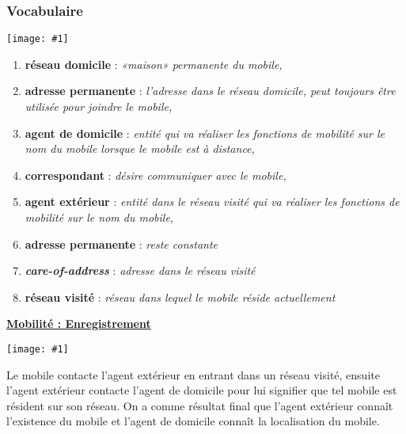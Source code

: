 \documentclass{article}
\newcommand{\imgR}[2]{\begin{center}\texttt{[image: \#1]}\end{center}}
\newcommand{\bfp}[2]{\item \textbf{#1} : \textit{#2}}
\newcommand{\stitre}[1]{\noindent\textbf{\underline{#1}} \\}
\begin{document}
\subsubsection{Vocabulaire}

\imgR{CN_163.png}{300} 

\begin{enumerate}
\bfp{réseau domicile}{«maison» permanente du mobile,}
\bfp{adresse permanente}{l'adresse dans le réseau domicile, peut toujours être utilisée pour joindre le mobile,}
\bfp{agent de domicile}{entité qui va réaliser les fonctions de mobilité sur le nom du mobile lorsque le 
mobile est 
à distance,}
\bfp{correspondant}{désire communiquer avec le mobile,}
\bfp{agent extérieur}{entité dans le réseau visité qui va réaliser les fonctions de mobilité sur le nom du 
mobile,}
\bfp{adresse permanente}{reste constante}
\bfp{\textit{care-of-address}}{adresse dans le réseau visité}
\bfp{réseau visité}{réseau dans lequel le mobile réside actuellement}
\end{enumerate}

\stitre{Mobilité : Enregistrement}

\imgR{CN_164.png}{300}
Le mobile contacte l'agent extérieur en entrant dans un réseau visité, ensuite l'agent extérieur contacte
l'agent de domicile pour lui signifier que tel mobile est résident sur son réseau. On a comme résultat final que 
l'agent extérieur connaît l'existence du mobile et l'agent de domicile connaît la localisation du mobile.
\end{document}
